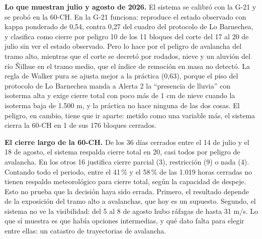\textbf{Lo que muestran julio y agosto de 2026.} El sistema se calibró con la G-21 y se probó en la 60-CH. En la G-21 funciona: reproduce el estado observado con kappa ponderado de 0,54, contra 0,27 del cuadro del protocolo de Lo Barnechea, y clasifica como cierre por peligro 10 de los 11 bloques del corte del 17 al 20 de julio sin ver el estado observado. Pero lo hace por el peligro de avalancha del tramo alto, mientras que el corte se decretó por rodados, nieve y un aluvión del río Ñilhue en el tramo medio, que el índice de remoción en masa no detectó. La regla de Walker pura se ajusta mejor a la práctica (0,63), porque el piso del protocolo de Lo Barnechea manda a Alerta 2 la ``presencia de lluvia'' con isoterma alta y exige cierre total con poco más de 1 cm de nieve cuando la isoterma baja de 1.500 m, y la práctica no hace ninguna de las dos cosas. El peligro, en cambio, tiene que ir aparte: metido como una variable más, el sistema cierra la 60-CH en 1 de sus 176 bloques cerrados.

\textbf{El cierre largo de la 60-CH.} De los 36 días cerrados entre el 14 de julio y el 18 de agosto, el sistema respalda cierre total en 20, casi todos por peligro de avalancha. En los otros 16 justifica cierre parcial (3), restricción (9) o nada (4). Contando todo el periodo, entre el 41\,\% y el 58\,\% de las 1.019 horas cerradas no tienen respaldo meteorológico para cierre total, según la capacidad de despeje. Esto no prueba que la decisión haya sido errada. Primero, el resultado depende de la exposición del tramo alto a avalanchas, que hoy es un supuesto. Segundo, el sistema no ve la visibilidad: del 5 al 8 de agosto hubo ráfagas de hasta 31 m/s. Lo que sí muestra es que había opciones intermedias, y qué dato falta para elegir entre ellas: un catastro de trayectorias de avalancha.

